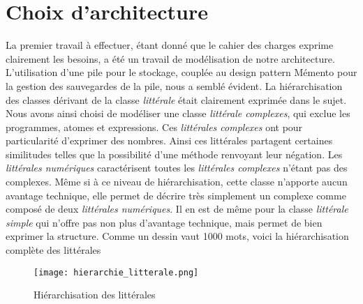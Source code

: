 \chapter{Choix d'architecture}

La premier travail à effectuer, étant donné que le cahier des charges exprime clairement les besoins, a été un travail de modélisation de notre architecture. L'utilisation d'une pile pour le stockage, couplée au design pattern Mémento pour la gestion des sauvegardes de la pile, nous a semblé évident.
\newline \newline
La hiérarchisation des classes dérivant de la classe \textit{littérale} était clairement exprimée dans le sujet. Nous avons ainsi choisi de modéliser une classe \textit{littérale complexes}, qui exclue les programmes, atomes et expressions. Ces \textit{littérales complexes} ont pour particularité d'exprimer des nombres. Ainsi ces littérales partagent certaines similitudes telles que la possibilité d'une méthode renvoyant leur négation. \newline 
Les \textit{littérales numériques} caractérisent toutes les \textit{littérales complexes} n'étant pas des complexes. Même si à ce niveau  de hiérarchisation, cette classe n'apporte aucun avantage technique, elle permet de décrire très simplement un complexe comme composé de deux \textit{littérales numériques}. Il en est de même pour la classe \textit{littérale simple} qui n'offre pas non plus d'avantage technique, mais permet de bien exprimer la structure.
\newline 
Comme un dessin vaut 1000 mots, voici la hiérarchisation complète des littérales

\begin{figure}[h]
    \centering
    \texttt{[image: hierarchie\_litterale.png]}
    \caption{Hiérarchisation des littérales}
    \label{fig:my_label}
\end{figure}

